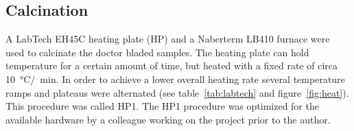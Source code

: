 \documentclass[a4paper]{article}
\newcommand{\td}[1]{\textbf{\textcolor{red}{#1}}}
\newcommand{\minutes}[1]{\SI{#1}{\minute}}
\newcommand{\oc}[1]{\SI{#1}{\degreeCelsius}}
\begin{document}
\subsection{Calcination}
A LabTech EH45C heating plate (HP) and a Naberterm LB410 furnace were used to calcinate the doctor bladed samples. 
The heating plate can hold temperature for a certain amount of time, but heated with a fixed rate of circa \oc{10}/\minutes{}.
In order to achieve a lower overall heating rate several temperature ramps and plateaus were alternated (see table~\ref{tab:labtech} and figure~\ref{fig:heat}).
This procedure was called HP1.
The HP1 procedure was optimized for the available hardware by a colleague working on the project prior to the author.
\end{document}

